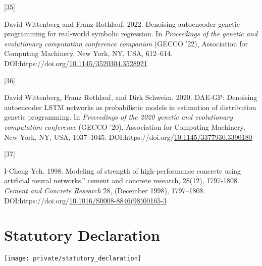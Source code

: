 \documentclass[
  11pt,
]{article}
\newlength{\cslhangindent}
\newlength{\csllabelwidth}
\newlength{\cslentryspacingunit} %
\newenvironment{CSLReferences}[2] %
 {%
  \setlength{\parindent}{0pt}
  \ifodd #1
  \let\oldpar\par
  \def\par{\hangindent=\cslhangindent\oldpar}
  \fi
  \setlength{\parskip}{#2\cslentryspacingunit}
 }%
 {}
\newcommand{\CSLLeftMargin}[1]{\parbox[t]{\csllabelwidth}{#1}}
\newcommand{\CSLRightInline}[1]{\parbox[t]{\linewidth - \csllabelwidth}{#1}\break}
\begin{document}
\begin{CSLReferences}{0}{0}
\leavevmode{}%
\CSLLeftMargin{{[}35{]} }%
\CSLRightInline{David Wittenberg and Franz Rothlauf. 2022. Denoising autoencoder genetic programming for real-world symbolic regression. In \emph{Proceedings of the genetic and evolutionary computation conference companion} (GECCO '22), Association for Computing Machinery, New York, NY, USA, 612--614. DOI:https://doi.org/\href{https://doi.org/10.1145/3520304.3528921}{10.1145/3520304.3528921}}

\leavevmode{}%
\CSLLeftMargin{{[}36{]} }%
\CSLRightInline{David Wittenberg, Franz Rothlauf, and Dirk Schweim. 2020. DAE-GP: Denoising autoencoder LSTM networks as probabilistic models in estimation of distribution genetic programming. In \emph{Proceedings of the 2020 genetic and evolutionary computation conference} (GECCO '20), Association for Computing Machinery, New York, NY, USA, 1037--1045. DOI:https://doi.org/\href{https://doi.org/10.1145/3377930.3390180}{10.1145/3377930.3390180}}

\leavevmode{}%
\CSLLeftMargin{{[}37{]} }%
\CSLRightInline{I-Cheng Yeh. 1998. Modeling of strength of high-performance concrete using artificial neural networks.'' cement and concrete research, 28(12), 1797-1808. \emph{Cement and Concrete Research} 28, (December 1998), 1797--1808. DOI:https://doi.org/\href{https://doi.org/10.1016/S0008-8846(98)00165-3}{10.1016/S0008-8846(98)00165-3}}

\end{CSLReferences}

\newpage

\hypertarget{IV}{%
\section*{Statutory Declaration}\label{IV}}

\begin{center}\texttt{[image: private/statutory\_declaration]} \end{center}
\end{document}
